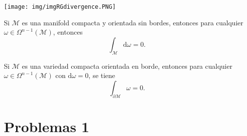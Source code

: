 \documentclass[../main]{subfiles}
\begin{document}
\begin{center}
    \texttt{[image: img/imgRGdivergence.PNG]}
\end{center}

\teorema{} Si $\mathcal{M}$ es una manifold compacta y orientada sin bordes, entonces para cualquier $\omega \in \Omega^{n-1}(\mathcal{M})$, entonces 
\begin{equation}
    \int_{\mathcal{M}} \mathrm{d}\omega=0.
\end{equation}

\teorema{} Si $\mathcal{M}$ es una variedad compacta orientada en borde, entonces para cualquier $\omega \in \Omega^{n-1}(\mathcal{M})$ con $\mathrm{d}\omega=0$, se tiene 
\begin{equation}
    \int_{\partial \mathcal{M}} \omega=0.
\end{equation}
\section*{Problemas 1}
\end{document}
